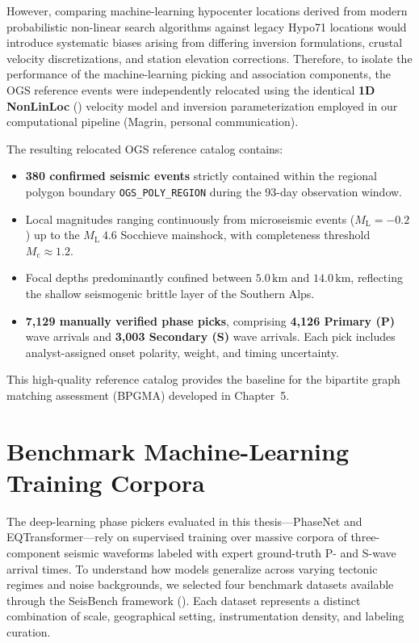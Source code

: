 However, comparing machine-learning hypocenter locations derived from modern probabilistic non-linear search algorithms against legacy Hypo71 locations would introduce systematic biases arising from differing inversion formulations, crustal velocity discretizations, and station elevation corrections. Therefore, to isolate the performance of the machine-learning picking and association components, the OGS reference events were independently relocated using the identical \textbf{1D NonLinLoc} (\cite{NonLinLoc}) velocity model and inversion parameterization employed in our computational pipeline (Magrin, personal communication).

The resulting relocated OGS reference catalog contains:
\begin{itemize}
  \item \textbf{380 confirmed seismic events} strictly contained within the regional polygon boundary \texttt{OGS\_POLY\_REGION} during the 93-day observation window.
  \item Local magnitudes ranging continuously from microseismic events ($M_{\mathrm{L}} = -0.2$) up to the $M_{\mathrm{L}}~4.6$ Socchieve mainshock, with completeness threshold $M_{\mathrm{c}} \approx 1.2$.
  \item Focal depths predominantly confined between $5.0\,\mathrm{km}$ and $14.0\,\mathrm{km}$, reflecting the shallow seismogenic brittle layer of the Southern Alps.
  \item \textbf{7,129 manually verified phase picks}, comprising \textbf{4,126 Primary (P)} wave arrivals and \textbf{3,003 Secondary (S)} wave arrivals. Each pick includes analyst-assigned onset polarity, weight, and timing uncertainty.
\end{itemize}

This high-quality reference catalog provides the baseline for the bipartite graph matching assessment (\ac{BPGMA}) developed in Chapter~5.

\section{Benchmark Machine-Learning Training Corpora}
\label{sec:benchmark_datasets}

The deep-learning phase pickers evaluated in this thesis—PhaseNet and \ac{EQTransformer}—rely on supervised training over massive corpora of three-component seismic waveforms labeled with expert ground-truth P- and S-wave arrival times. To understand how models generalize across varying tectonic regimes and noise backgrounds, we selected four benchmark datasets available through the SeisBench framework (\cite{SeisBench}). Each dataset represents a distinct combination of scale, geographical setting, instrumentation density, and labeling curation.

